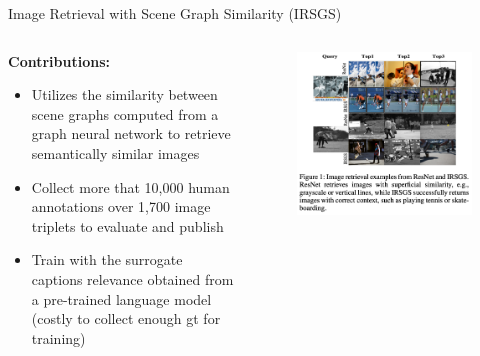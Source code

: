 \documentclass{beamer}
\begin{document}
\begin{frame}{Image Retrieval with Scene Graph Similarity (IRSGS)}
\begin{columns}
    \begin{column}{0.5\linewidth}
    \textbf{Contributions:}
        \begin{itemize}
            \item Utilizes the similarity between scene graphs computed from a graph neural network to retrieve semantically similar images
            \item Collect more that 10,000 human annotations over 1,700 image triplets to evaluate and publish
            \item Train with the surrogate captions relevance obtained from a pre-trained language model (costly to collect enough gt for training)
        \end{itemize}
    \end{column}
    
    \begin{column}{0.5\linewidth}
        \begin{figure}
            \centering
            \includegraphics[height=0.6\textheight]{pic/Retrieval/motivation.png}
        \end{figure}
    \end{column}
\end{columns}
\end{frame}
\end{document}
